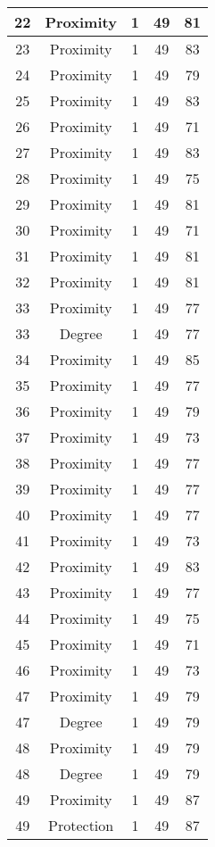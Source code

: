 \documentclass[results.tex]{subfiles}
\begin{document}
\begin{center}
\begin{tabular}{| c || c | c | c | c |}
    \hline
    22 & Proximity & 1 & 49 & 81 \\ 
    \hline
    23 & Proximity & 1 & 49 & 83 \\ 
    \hline
    24 & Proximity & 1 & 49 & 79 \\ 
    \hline
    25 & Proximity & 1 & 49 & 83 \\ 
    \hline
    26 & Proximity & 1 & 49 & 71 \\ 
    \hline
    27 & Proximity & 1 & 49 & 83 \\ 
    \hline
    28 & Proximity & 1 & 49 & 75 \\ 
    \hline
    29 & Proximity & 1 & 49 & 81 \\ 
    \hline
    30 & Proximity & 1 & 49 & 71 \\ 
    \hline
    31 & Proximity & 1 & 49 & 81 \\ 
    \hline
    32 & Proximity & 1 & 49 & 81 \\ 
    \hline
    33 & Proximity & 1 & 49 & 77 \\ 
    \hline
    33 & Degree & 1 & 49 & 77 \\ 
    \hline
    34 & Proximity & 1 & 49 & 85 \\ 
    \hline
    35 & Proximity & 1 & 49 & 77 \\ 
    \hline
    36 & Proximity & 1 & 49 & 79 \\ 
    \hline
    37 & Proximity & 1 & 49 & 73 \\ 
    \hline
    38 & Proximity & 1 & 49 & 77 \\ 
    \hline
    39 & Proximity & 1 & 49 & 77 \\ 
    \hline
    40 & Proximity & 1 & 49 & 77 \\ 
    \hline
    41 & Proximity & 1 & 49 & 73 \\ 
    \hline
    42 & Proximity & 1 & 49 & 83 \\ 
    \hline
    43 & Proximity & 1 & 49 & 77 \\ 
    \hline
    44 & Proximity & 1 & 49 & 75 \\ 
    \hline
    45 & Proximity & 1 & 49 & 71 \\ 
    \hline
    46 & Proximity & 1 & 49 & 73 \\ 
    \hline
    47 & Proximity & 1 & 49 & 79 \\ 
    \hline
    47 & Degree & 1 & 49 & 79 \\ 
    \hline
    48 & Proximity & 1 & 49 & 79 \\ 
    \hline
    48 & Degree & 1 & 49 & 79 \\ 
    \hline
    49 & Proximity & 1 & 49 & 87 \\ 
    \hline
    49 & Protection & 1 & 49 & 87 \\ 
    \hline   \end{tabular}
\end{center}
\end{document}
